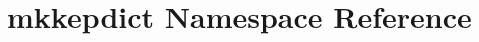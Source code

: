 \hypertarget{namespacemkkepdict}{\section{mkkepdict Namespace Reference}
\label{namespacemkkepdict}
}

